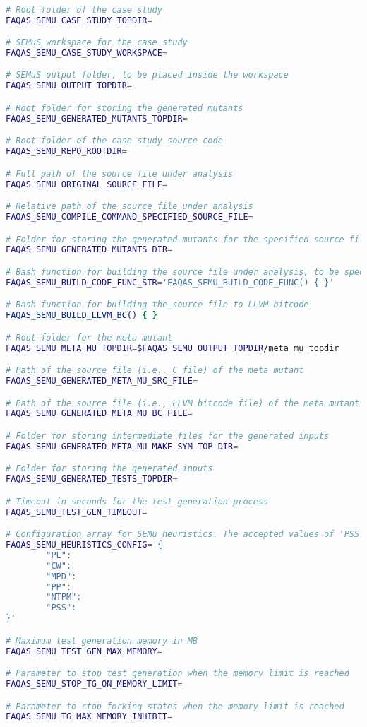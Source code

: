 \begin{lstlisting}[language=bash,label=listing:SEMUS:conf,caption=faqas\_semus\_conf.sh file.]

# Root folder of the case study
FAQAS_SEMU_CASE_STUDY_TOPDIR=

# SEMuS workspace for the case study
FAQAS_SEMU_CASE_STUDY_WORKSPACE=

# SEMuS output folder, to be placed inside the workspace
FAQAS_SEMU_OUTPUT_TOPDIR=

# Root folder for storing the generated mutants
FAQAS_SEMU_GENERATED_MUTANTS_TOPDIR=

# Root folder of the case study source code
FAQAS_SEMU_REPO_ROOTDIR=

# Full path of the source file under analysis
FAQAS_SEMU_ORIGINAL_SOURCE_FILE=

# Relative path of the source file under analysis
FAQAS_SEMU_COMPILE_COMMAND_SPECIFIED_SOURCE_FILE=

# Folder for storing the generated mutants for the specified source file
FAQAS_SEMU_GENERATED_MUTANTS_DIR=

# Bash function for building the source file under analysis, to be specified in string format
FAQAS_SEMU_BUILD_CODE_FUNC_STR='FAQAS_SEMU_BUILD_CODE_FUNC() { }'

# Bash function for building the source file to LLVM bitcode
FAQAS_SEMU_BUILD_LLVM_BC() { }

# Root folder for the meta mutant
FAQAS_SEMU_META_MU_TOPDIR=$FAQAS_SEMU_OUTPUT_TOPDIR/meta_mu_topdir

# Path of the source file (i.e., C file) of the meta mutant
FAQAS_SEMU_GENERATED_META_MU_SRC_FILE=

# Path of the source file (i.e., LLVM bitcode file) of the meta mutant
FAQAS_SEMU_GENERATED_META_MU_BC_FILE=

# Folder for storing intermediate files for the generated inputs 
FAQAS_SEMU_GENERATED_META_MU_MAKE_SYM_TOP_DIR=

# Folder for storing the generated inputs 
FAQAS_SEMU_GENERATED_TESTS_TOPDIR=

# Timeout in seconds for the test generation process
FAQAS_SEMU_TEST_GEN_TIMEOUT=

# Configuration array for SEMu heuristics. The accepted values of 'PSS' are 'RND' for random and 'MDO' for minimum distance to output
FAQAS_SEMU_HEURISTICS_CONFIG='{
        "PL": 
        "CW": 
        "MPD": 
        "PP": 
        "NTPM": 
        "PSS": 
}'

# Maximum test generation memory in MB
FAQAS_SEMU_TEST_GEN_MAX_MEMORY=

# Parameter to stop test generation when the memory limit is reached
FAQAS_SEMU_STOP_TG_ON_MEMORY_LIMIT=

# Parameter to stop forking states when the memory limit is reached
FAQAS_SEMU_TG_MAX_MEMORY_INHIBIT=

\end{lstlisting}

